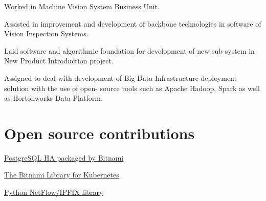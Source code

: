 \documentclass[letterpaper]{deedy-resume} %
\begin{document}
\begin{minipage}[t]{0.66\textwidth}
\sectionspace %


\begin{tightitemize}
\item Worked in Machine Vision System Business Unit.
\item Assisted in improvement and development of backbone technologies in software of Vision Inspection Systems.
\item Laid software and algorithmic foundation for development of new sub-system in New Product Introduction project.
\end{tightitemize}

\sectionspace %


\begin{tightitemize}
\item Assigned to deal with development of Big Data Infrastructure deployment solution with the use of open-
source tools such as Apache Hadoop, Spark as well as Hortonworks Data Platform.
\end{tightitemize}

\sectionspace %

\section{Open source contributions} 
\vspace{\topsep}
\begin{tightitemize}
\item \href{https://github.com/bitnami/bitnami-docker-postgresql-repmgr}{PostgreSQL HA packaged by Bitnami} 
\item \href{https://github.com/bitnami/charts}{The Bitnami Library for Kubernetes}
\item \href{https://github.com/bitkeks/python-netflow-v9-softflowd}{Python NetFlow/IPFIX library}
\end{tightitemize}


\end{minipage} %

\end{document}

